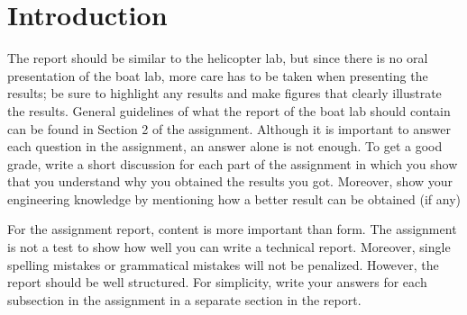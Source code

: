\section{Introduction}\label{sec:intro}

The report should be similar to the helicopter lab, but since there is no oral presentation of the boat lab, more care has to be taken when presenting the results; be sure to highlight any results and make figures that clearly illustrate the results. General guidelines of what the report of the boat lab should contain can be found in Section 2 of the assignment. Although it is important to answer each question in the assignment, an answer alone is not enough. To get a good grade, write a short discussion for each part of the assignment in which you show that you understand why you obtained the results you got. Moreover, show your engineering knowledge by mentioning how a better result can be obtained (if any)

For the assignment report, content is more important than form. The assignment is not a test to show how well you can write a technical report. Moreover, single spelling mistakes or grammatical mistakes will not be penalized. However, the report should be well structured. For simplicity, write your answers for each subsection in the assignment in a separate section in the report.

